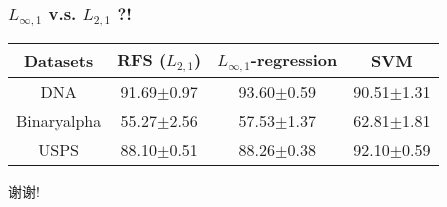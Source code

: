 \documentclass{beamer}
\begin{document}
\begin{frame}[fragile]
    \frametitle{$L_{\infty,1}$ v.s. $L_{2,1}$ ?!}
    \scriptsize
    \begin{table}
        \begin{tabular}{cccc}
            \hline\hline
            Datasets    & RFS ($L_{2,1}$) & $L_{\infty,1}$-regression & SVM\\
            \hline
            DNA         & 91.69$\pm$0.97  & 93.60$\pm$0.59 & 90.51$\pm$1.31\\
            \hline
            Binaryalpha & 55.27$\pm$2.56  & 57.53$\pm$1.37 & 62.81$\pm$1.81\\
            \hline
            USPS        & 88.10$\pm$0.51  & 88.26$\pm$0.38 & 92.10$\pm$0.59\\
            \hline\hline
        \end{tabular}
    \end{table}
\end{frame}

\begin{frame}
    \centering
    \Huge{谢谢!}

    \vspace{20pt}
    \scriptsize
    
    
\end{frame}
\end{document}
